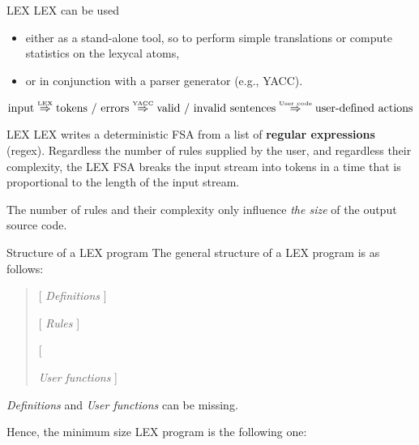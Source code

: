 \begin{frame}[fragile]{LEX}
LEX can be used
\begin{itemize}
\item either as a stand-alone tool, so to perform simple
translations or compute statistics on the lexycal atoms,
\item or in conjunction with a parser generator (e.g., YACC).
\end{itemize}


\vspace{20pt}

$$ \mbox{input}
 \stackrel{\mbox{\tiny LEX}}{\Rightarrow}
 \mbox{tokens / errors}
 \stackrel{\mbox{\tiny YACC}}{\Rightarrow}
                \mbox{valid / invalid sentences}
 \stackrel{\mbox{\tiny User code}}{\Rightarrow}
 \mbox{user-defined actions}
$$


\end{frame}
\begin{frame}[fragile]{LEX}
LEX writes a deterministic FSA from a list of \textbf{regular expressions}
(regex). Regardless the number of rules supplied by the user, and regardless
their complexity, the LEX FSA breaks the input stream into tokens
in a time that is proportional to the length of the input stream.


\vspace{20pt}

The number of rules and their complexity only influence
\emph{the size\/} of the output source code.

\end{frame}
\begin{frame}[fragile]{Structure of a LEX program}
The general structure of a LEX program is as follows:


\vspace{20pt}

\begin{quote}
[ {\em Definitions\/} ]

\pcpc

[ {\em Rules\/} ]

[ \pcpc

{\em User functions\/} ]
\end{quote}


\vspace{20pt}

{\em Definitions\/} and {\em User functions\/} can be missing.

\vspace{20pt}


Hence, the minimum size LEX program is the following one:


\vspace{20pt}

\begin{center}\pcpc\end{center}





\end{frame}
